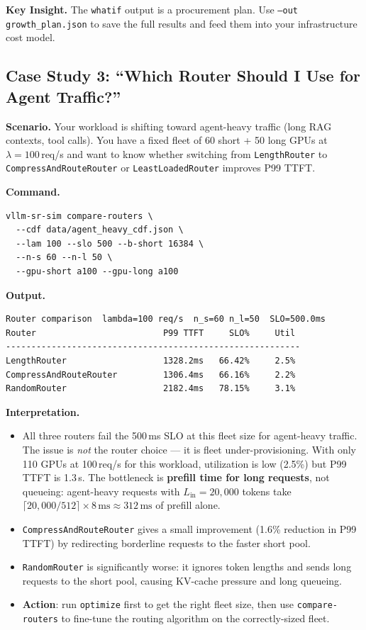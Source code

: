 \documentclass[11pt,a4paper]{article}
\newenvironment{keyinsight}
  {\begin{mdframed}[backgroundcolor=blue!5!white,linecolor=blue!60!black,linewidth=1pt]
   \textbf{Key Insight. }\ignorespaces}
  {\end{mdframed}}
\begin{document}
\begin{keyinsight}
  The \texttt{whatif} output is a procurement plan.  Use
  \texttt{--out growth\_plan.json} to save the full results and feed
  them into your infrastructure cost model.
\end{keyinsight}

\subsection{Case Study 3: ``Which Router Should I Use for Agent Traffic?''}
\label{sec:cs-routers}

\textbf{Scenario.}  Your workload is shifting toward agent-heavy
traffic (long RAG contexts, tool calls).  You have a fixed fleet
of 60 short + 50 long GPUs at $\lambda = 100$\,req/s and want to
know whether switching from \texttt{LengthRouter} to
\texttt{CompressAndRouteRouter} or \texttt{LeastLoadedRouter}
improves P99 TTFT.

\textbf{Command.}
\begin{lstlisting}[style=shell]
vllm-sr-sim compare-routers \
  --cdf data/agent_heavy_cdf.json \
  --lam 100 --slo 500 --b-short 16384 \
  --n-s 60 --n-l 50 \
  --gpu-short a100 --gpu-long a100
\end{lstlisting}

\textbf{Output.}
\begin{lstlisting}[style=output]
Router comparison  lambda=100 req/s  n_s=60 n_l=50  SLO=500.0ms
Router                         P99 TTFT     SLO%     Util
----------------------------------------------------------
LengthRouter                   1328.2ms   66.42%     2.5%
CompressAndRouteRouter         1306.4ms   66.16%     2.2%
RandomRouter                   2182.4ms   78.15%     3.1%
\end{lstlisting}

\textbf{Interpretation.}
\begin{itemize}[nosep]
  \item All three routers fail the 500\,ms SLO at this fleet size
    for agent-heavy traffic.  The issue is \emph{not} the router
    choice --- it is fleet under-provisioning.  With only 110 GPUs
    at 100\,req/s for this workload, utilization is low (2.5\%) but
    P99 TTFT is 1.3\,s.  The bottleneck is \textbf{prefill time for
    long requests}, not queueing: agent-heavy requests with
    $L_{\text{in}} = 20{,}000$ tokens take
    $\lceil 20{,}000/512 \rceil \times 8\,\text{ms} \approx 312\,\text{ms}$
    of prefill alone.
  \item \texttt{CompressAndRouteRouter} gives a small improvement
    (1.6\% reduction in P99 TTFT) by redirecting borderline requests
    to the faster short pool.
  \item \texttt{RandomRouter} is significantly worse: it ignores
    token lengths and sends long requests to the short pool, causing
    KV-cache pressure and long queueing.
  \item \textbf{Action}: run \texttt{optimize} first to get the right
    fleet size, then use \texttt{compare-routers} to fine-tune the
    routing algorithm on the correctly-sized fleet.
\end{itemize}
\end{document}
